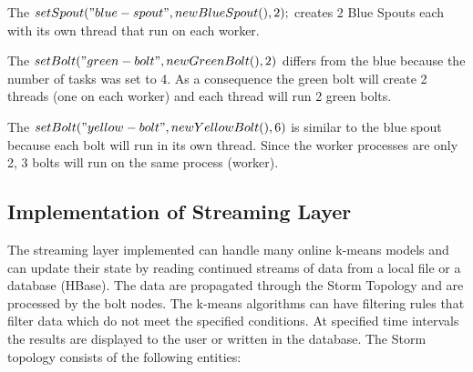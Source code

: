 \documentclass{lmproj}
\begin{document}
The $setSpout("blue-spout", new BlueSpout(), 2);$ \space [3] creates 2 Blue Spouts each with its own thread that run on each worker.

The $setBolt("green-bolt", new GreenBolt(), 2)$ \space [4] differs from the blue because the number of tasks was set to 4. As a consequence the green bolt will create 2 threads (one on each worker) and each thread will run 2 green bolts.

The $setBolt("yellow-bolt", new YellowBolt(), 6)$ \space [5] is similar to the blue spout because each bolt will run in its own thread. Since the worker processes are only 2, 3 bolts will run on the same process (worker). 

\subsection{Implementation of Streaming Layer}

The streaming layer implemented can handle many online k-means models and can update their state by reading continued streams of data from a local file or a database (HBase). The data are propagated through the Storm Topology and are processed by the bolt nodes. The k-means algorithms can have filtering rules that filter data which do not meet the specified conditions. At specified time intervals the results are displayed to the user or written in the database. The Storm topology consists of the following entities:
\end{document}
